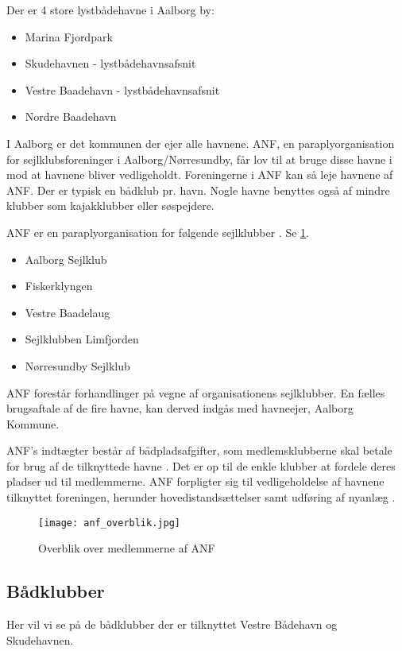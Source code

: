 Der er 4 store lystbådehavne i Aalborg by:
\begin{itemize}[noitemsep]
    \item Marina Fjordpark
    \item Skudehavnen - lystbådehavnsafsnit
    \item Vestre Baadehavn - lystbådehavnsafsnit
    \item Nordre Baadehavn
\end{itemize}

I Aalborg er det kommunen der ejer alle havnene. ANF, en paraplyorganisation for sejlklubsforeninger i Aalborg/Nørresundby, får lov til at bruge disse havne i mod at havnene bliver vedligeholdt. Foreningerne i ANF kan så leje havnene af ANF. Der er typisk en bådklub pr. havn. Nogle havne benyttes også af mindre klubber som kajakklubber eller søspejdere.

ANF er en paraplyorganisation for følgende sejlklubber \cite{anf_havnereglement}. Se \cref{fig:anf_overblik}.
\begin{itemize}[noitemsep]
	\item Aalborg Sejlklub
	\item Fiskerklyngen
	\item Vestre Baadelaug
	\item Sejlklubben Limfjorden
	\item Nørresundby Sejlklub
\end{itemize}
 
ANF forestår forhandlinger på vegne af organisationens sejlklubber. En fælles brugsaftale af de fire havne, kan derved indgås med havneejer, Aalborg Kommune.

ANF's indtægter består af bådpladsafgifter, som medlemsklubberne skal betale for brug af de tilknyttede havne \cite{anf_budget_2013}. Det er op til de enkle klubber at fordele deres pladser ud til medlemmerne. ANF forpligter sig til vedligeholdelse af havnene tilknyttet foreningen, herunder hovedistandsættelser samt udføring af nyanlæg \cite{anf_brugsaftale_2012}.

\begin{figure}
  \centering
  \texttt{[image: anf\_overblik.jpg]}
 	\caption{Overblik over medlemmerne af ANF} 	\label{fig:anf_overblik}
\end{figure}



\subsection{Bådklubber}
Her vil vi se på de bådklubber der er tilknyttet Vestre Bådehavn og Skudehavnen.

